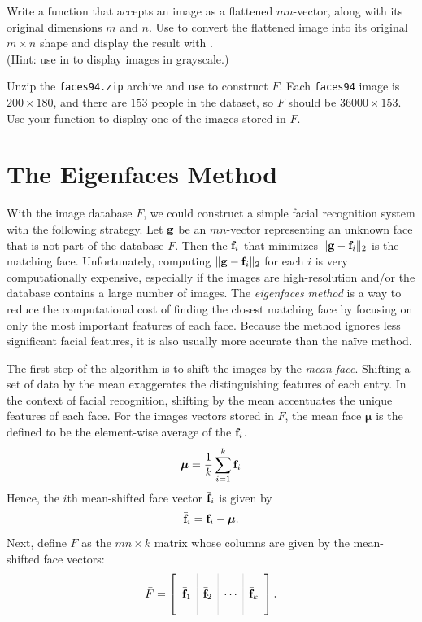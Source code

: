 \begin{problem} %
Write a function that accepts an image as a flattened $mn$-vector, along with its original dimensions $m$ and $n$.
Use  to convert the flattened image into its original $m\times n$ shape and display the result with .
\\ (Hint: use  in  to display images in grayscale.)

Unzip the \texttt{faces94.zip} archive and use  to construct $F$.
Each \texttt{faces94} image is $200 \times 180$, and there are $153$ people in the dataset, so $F$ should be $36000 \times 153$.
Use your function to display one of the images stored in $F$.
\label{prob:visualize-faces}
\end{problem}

\section*{The Eigenfaces Method} %

With the image database $F$, we could construct a simple facial recognition system with the following strategy.
Let $\mathbf{g}$ be an $mn$-vector representing an unknown face that is not part of the database $F$.
Then the $\mathbf{f}_i$ that minimizes $\|\mathbf{g} - \mathbf{f}_i\|_2$ is the matching face.
Unfortunately, computing $\|\mathbf{g} - \mathbf{f}_i\|_2$ for each $i$ is very computationally expensive, especially if the images are high-resolution and/or the database contains a large number of images.
The \emph{eigenfaces method} is a way to reduce the computational cost of finding the closest matching face by focusing on only the most important features of each face.
Because the method ignores less significant facial features, it is also usually more accurate than the na\"ive method.

The first step of the algorithm is to shift the images by the \emph{mean face}.
Shifting a set of data by the mean exaggerates the distinguishing features of each entry.
In the context of facial recognition, shifting by the mean accentuates the unique features of each face.
For the images vectors stored in $F$, the mean face $\boldsymbol{\mu}$ is the defined to be the element-wise average of the $\mathbf{f}_i$.
\[
\boldsymbol{\mu} = \frac{1}{k}\sum_{i=1}^k \mathbf{f}_i
\]
Hence, the $i$th mean-shifted face vector $\bar{\mathbf{f}}_i$ is given by
\[
\bar{\mathbf{f}}_i = \mathbf{f}_i - \boldsymbol{\mu}.
\]
Next, define $\bar{F}$ as the $mn \times k$ matrix whose columns are given by the mean-shifted face vectors:
\[
\bar{F} = \left[\begin{array}{c|c|c|c}
\arrayrulecolor{lightgray}
& & & \\
\bar{\f}_1 & \bar{\f}_2 & \cdots & \bar{\f}_k
\\
& & &
\end{array}\right].
\]

